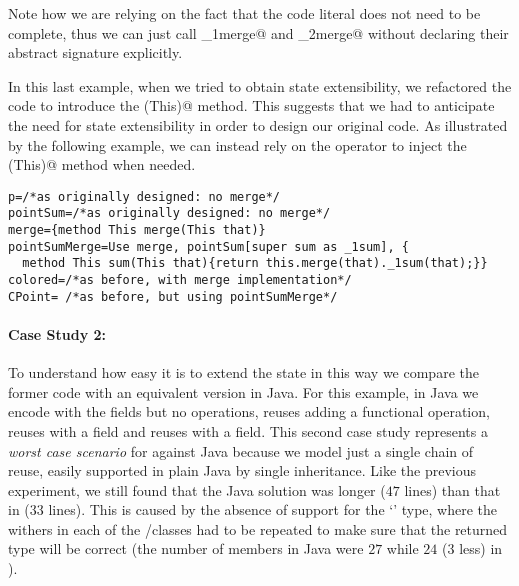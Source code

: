 Note how we are relying on the fact that the code literal
 does not need to be complete, 
thus we can just call \Q@_1merge@ and \Q@_2merge@ without
 declaring their abstract signature explicitly.

In this last example, when we tried to obtain state extensibility, we refactored the code to introduce  the \Q@merge(This)@ method.
This suggests that we had to
anticipate the need for state extensibility
in order to design our original code.
As illustrated by the following example, we can instead rely on the \Q@super@ operator to inject the \Q@merge(This)@ method when needed.

\saveSpace\saveSpace \begin{lstlisting}
p=/*as originally designed: no merge*/
pointSum=/*as originally designed: no merge*/
merge={method This merge(This that)}
pointSumMerge=Use merge, pointSum[super sum as _1sum], { 
  method This sum(This that){return this.merge(that)._1sum(that);}}
colored=/*as before, with merge implementation*/
CPoint= /*as before, but using pointSumMerge*/
\end{lstlisting} \saveSpace\saveSpace 



\paragraph{Case Study 2:}
To understand how easy it is to extend the state in this
way we compare the former code with an equivalent version in
Java.
For this example, in Java we encode \Q@Point@ with the fields but no operations,
\Q@PointSum@ reuses \Q@Point@ adding a functional \Q@sum@ operation,
\Q@CPoint@ reuses \Q@PointSum@ with a \Q@Color@ field
and \Q@FCPoint@ reuses \Q@CPoint@ with a \Q@Flavour@ field.
This second case study represents a \emph{worst case scenario} for \name against Java because we model just a single chain of reuse,
easily supported in plain Java by single inheritance.
Like the previous experiment, we still found that the Java solution was longer ($47$ lines) than that
in \name ($33$ lines). This is caused by the absence of support for the `\Q@This@' type,
where the withers in each of the \Q@CPoint@/\Q@FCpoint@ classes had to be repeated
to make sure that the returned type will be correct (the number of members in Java were $27$ while $24$ ($3$ less)
in \name).

